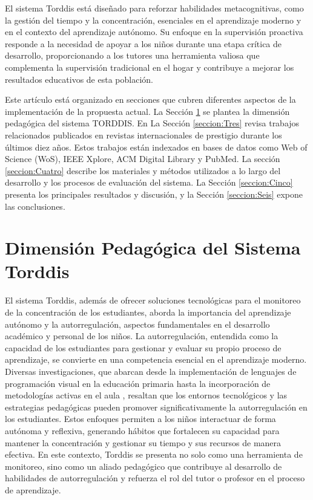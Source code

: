 \documentclass[a4paper,fleqn]{cas-sc}
\begin{document}
	El sistema Torddis está diseñado para reforzar habilidades metacognitivas, como la gestión del tiempo y la concentración, esenciales en el aprendizaje moderno y en el contexto del aprendizaje autónomo. Su enfoque en la supervisión proactiva responde a la necesidad de apoyar a los niños durante una etapa crítica de desarrollo, proporcionando a los tutores una herramienta valiosa que complementa la supervisión tradicional en el hogar y contribuye a mejorar los resultados educativos de esta población.
	
	Este artículo está organizado en secciones que cubren diferentes aspectos de la implementación de la propuesta actual. La Sección \ref{seccion:Dos} se plantea la dimensión pedagógica del sistema TORDDIS. En La Sección \ref{seccion:Tres} revisa trabajos relacionados publicados en revistas internacionales de prestigio durante los últimos diez años. Estos trabajos están indexados en bases de datos como Web of Science (WoS), IEEE Xplore, ACM Digital Library y PubMed. La sección \ref{seccion:Cuatro} describe los materiales y métodos utilizados a lo largo del desarrollo y los procesos de evaluación del sistema. La Sección \ref{seccion:Cinco} presenta los principales resultados y discusión, y la Sección \ref{seccion:Seis} expone las conclusiones.
	
	\section{Dimensión Pedagógica del Sistema Torddis}
	\label{seccion:Dos}	
	El sistema Torddis, además de ofrecer soluciones tecnológicas para el monitoreo de la concentración de los estudiantes, aborda la importancia del aprendizaje autónomo y la autorregulación, aspectos fundamentales en el desarrollo académico y personal de los niños. La autorregulación, entendida como la capacidad de los estudiantes para gestionar y evaluar su propio proceso de aprendizaje, se convierte en una competencia esencial en el aprendizaje moderno. Diversas investigaciones, que abarcan desde la implementación de lenguajes de programación visual en la educación primaria \citep{SaezLopez2016Visual} hasta la incorporación de metodologías activas en el aula \citep{Mohamed2018Implementing}, resaltan que los entornos tecnológicos y las estrategias pedagógicas pueden promover significativamente la autorregulación en los estudiantes. Estos enfoques permiten a los niños interactuar de forma autónoma y reflexiva, generando hábitos que fortalecen su capacidad para mantener la concentración y gestionar su tiempo y sus recursos de manera efectiva. En este contexto, Torddis se presenta no solo como una herramienta de monitoreo, sino como un aliado pedagógico que contribuye al desarrollo de habilidades de autorregulación y refuerza el rol del tutor o profesor en el proceso de aprendizaje.
	
\end{document}
